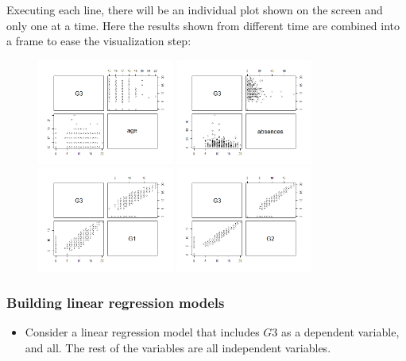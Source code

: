 \documentclass[a4paper]{article}
\numberwithin{equation}{section}
\begin{document}
Executing each line, there will be an individual plot shown on the screen and only one at a time. Here the results shown from different time are combined into a frame to ease the visualization step:

\begin{figure}[H]
  \centering
  \includegraphics[width=0.4\textwidth]{pairs_age.png}
  \includegraphics[width=0.4\textwidth]{pairs_ab.png}
  \includegraphics[width=0.4\textwidth]{pairs_g1.png}
  \includegraphics[width=0.4\textwidth]{pairs_g2.png}
\end{figure}

\newpage

\subsubsection{Building linear regression models}
\begin{itemize}
  \item Consider a linear regression model that includes \(G3\) as a dependent variable, and all. The rest of the variables are all independent variables.
\end{itemize}
\end{document}
